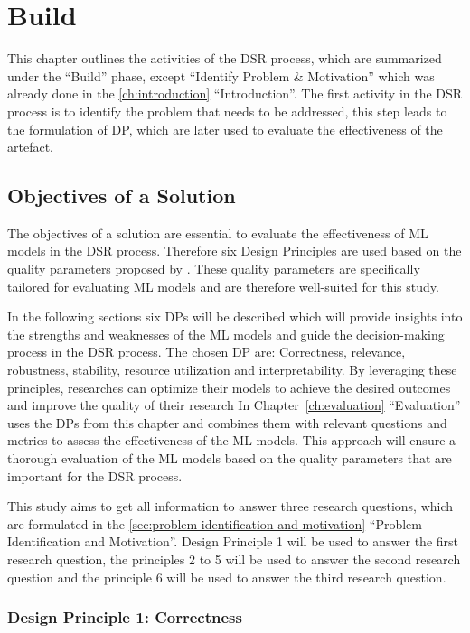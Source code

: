 \chapter{Build}\label{ch:build}
This chapter outlines the activities of the \ac{DSR} process, which are
summarized under the ``Build'' phase, except ``Identify Problem \& Motivation'' which was already done in the
\cref{ch:introduction} ``Introduction''.
The first activity in the DSR process is to identify the problem that needs to be addressed,
this step leads to the formulation of \ac{DP}, which are later used to evaluate
the effectiveness of the artefact.


\section{Objectives of a Solution}\label{sec:objectives-of-a-solution}

The objectives of a solution are essential to evaluate the effectiveness of ML models in the
DSR process.
Therefore six Design Principles are used based on the quality parameters proposed by \cite{siebert2022construction}.
These quality parameters are specifically tailored for evaluating ML models and are therefore well-suited for this
study.

In the following sections six DPs will be described which will provide insights into the strengths and weaknesses of the
ML models and guide the decision-making process in the DSR process.
The chosen \ac{DP} are: Correctness, relevance, robustness, stability, resource utilization and interpretability.
By leveraging these principles, researches can optimize their models to achieve the desired outcomes and improve the
quality of their research
In Chapter~\ref{ch:evaluation} ``Evaluation'' uses the DPs from this chapter and combines them with relevant
questions and metrics to assess the effectiveness of the ML models.
This approach will ensure a thorough evaluation of the ML models based on the quality parameters that are important
for the DSR process.

This study aims to get all information to answer three research questions, which are formulated in the
\cref{sec:problem-identification-and-motivation} ``Problem Identification and Motivation''.
Design Principle 1 will be used to answer the first research question, the principles 2 to 5 will be used to answer the
second research question and the principle 6 will be used to answer the third research question.

\subsection*{Design Principle 1: Correctness}\label{subsec:correctness}

